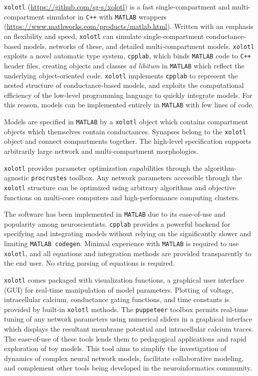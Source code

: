 \documentclass{frontiersSCNS} %
\begin{document}
\texttt{xolotl} (\url{https://github.com/sg-s/xolotl}) is a fast single-compartment and multi-compartment simulator in \texttt{C++} with \texttt{MATLAB} wrappers (\url{https://www.mathworks.com/products/matlab.html}). Written with an emphasis on flexibility and speed, \texttt{xolotl} can simulate single-compartment conductance-based models, networks of these, and detailed multi-compartment models. \texttt{xolotl} exploits a novel automatic type system, \texttt{cpplab}, which binds \texttt{MATLAB} code to \texttt{C++} header files, creating objects and classes \textit{ad libitum} in \texttt{MATLAB} which reflect the underlying object-oriented code. \texttt{xolotl} implements \texttt{cpplab} to represent the nested structure of conductance-based models, and exploits the computational efficiency of the low-level programming language to quickly integrate models. For this reason, models can be implemented entirely in \texttt{MATLAB} with few lines of code.

Models are specified in \texttt{MATLAB} by a \texttt{xolotl} object which contains compartment objects which themselves contain conductances. Synapses belong to the \texttt{xolotl} object and connect compartments together. The high-level specification supports arbitrarily large network and multi-compartment morphologies. 

\texttt{xolotl} provides parameter optimization capabilities through the algorithm-agnostic \texttt{procrustes} toolbox. Any network parameters accessible through the \texttt{xolotl} structure can be optimized using arbitrary algorithms and objective functions on multi-core computers and high-performance computing clusters.

The software has been implemented in \texttt{MATLAB} due to its ease-of-use and popularity among neuroscientists. \texttt{cpplab} provides a powerful backend for specifying and integrating models without relying on the significantly slower and limiting \texttt{MATLAB codegen}. Minimal experience with \texttt{MATLAB} is required to use \texttt{xolotl}, and all equations and integration methods are provided transparently to the end user. No string parsing of equations is required. 

\texttt{xolotl} comes packaged with visualization functions, a graphical user interface (GUI) for real-time manipulation of model parameters. Plotting of voltage, intracellular calcium, conductance gating functions, and time constants is provided by built-in \texttt{xolotl} methods. The \texttt{puppeteer} toolbox permits real-time tuning of any network parameters using numerical sliders in a graphical interface which displays the resultant membrane potential and intracellular calcium traces. The ease-of-use of these tools lends them to pedagogical applications and rapid exploration of toy models. This tool aims to simplify the investigation of dynamics of complex neural network models, facilitate collaborative modeling, and complement other tools being developed in the neuroinformatics community.
\end{document}
